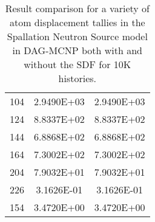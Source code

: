 \begin{table}
\begin{center}
\begin{tabular}{lcc}
      104          & 2.9490E+03 & 2.9490E+03        \\
      124          & 8.8337E+02 & 8.8337E+02        \\
      144          & 6.8868E+02 & 6.8868E+02        \\
      164          & 7.3002E+02 & 7.3002E+02        \\
      204          & 7.9032E+01 & 7.9032E+01        \\
      226          & 3.1626E-01 & 3.1626E-01        \\
      154          & 3.4720E+00 & 3.4720E+00        \\
      \bottomrule
    \end{tabular}
    \caption[Results of tally values in SNS for various DAG-MNP
      implementations.]{Result comparison for a variety of atom displacement
      tallies in the Spallation Neutron Source model in DAG-MCNP both with and
      without the SDF for 10K histories.}
  \end{center}
\end{table}
